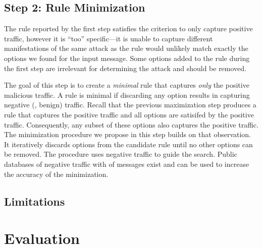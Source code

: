 \documentclass[runningheads]{llncs}
\begin{document}
\subsection{Step 2: Rule Minimization}


The rule reported by the first step satisfies the criterion to only
capture positive traffic, however it is ``too'' specific---it is
unable to capture different manifestations of the same attack as the
rule would unlikely match exactly the options we found for the input
message. Some options added to the rule during the first step are
irrelevant for determining the attack and should be removed.

The goal of this step is to create a \emph{minimal} rule that captures
\emph{only} the positive malicious traffic. A rule is minimal if
discarding any option results in capturing negative (\ie{}, benign)
traffic. Recall that the previous maximization step produces a rule
that captures the positive traffic and all options are satisifed by
the positive traffic. Consequently, any subset of these options also
captures the positive traffic. The minimization procedure we propose
in this step builds on that observation. It iteratively discards
options from the candidate rule until no other options can be
removed. The procedure uses negative traffic to guide the
search. Public databases of negative traffic with  of
messages exist  and can be used to increase the
accuracy of the minimization.

\subsection{Limitations}


\section{Evaluation}


\end{document}
